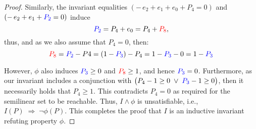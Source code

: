 \begin{proof}
	
	\noindent
	Similarly, the invariant equalities 
	$(-\,e_{2}+e_{1}+e_{0}+P_{4}=0)$ and $(	-\,e_{2}+e_{1}+\textcolor{blue}{P_{2}}=0)$
	induce
	\[
	\textcolor{blue}{P_{2}}=P_{4}+e_{0}=P_{4}+\textcolor{red}{P_{8}},
	\]
	thus, and as we also assume that $P_4=0$, then:
	\[
	\textcolor{red}{P_{8}}=\textcolor{blue}{P_2}-P4=(1-\textcolor{blue}{P_{3}})-P_{4}=1-\textcolor{blue}{P_{3}}-0=1-\textcolor{blue}{P_{3}}
	\]
	
	
	
	
	\noindent
	However, $\phi$ also induces $\textcolor{blue}{P_{3}}\ge0$ and $\textcolor{red}{P_{8}}\ge1$, and hence $\textcolor{blue}{P_{3}}=0$.  
	Furthermore, as our invariant includes a conjunction with $\bigl(P_{4}-1\ge0\;\lor\;\textcolor{blue}{P_{3}}-1\ge0\bigr)$, then it necessarily holds that \(P_{4}\ge1\). This contradicts \(P_{4}=0\) as required for the semilinear set to be reachable.
	Thus, $I\land\phi$ is unsatisfiable, i.e., 
	$
	I(P)\;\Longrightarrow\;\neg\phi(P)$.
	This completes the proof that $I$ is an inductive invariant refuting property $\phi$.
\end{proof}


